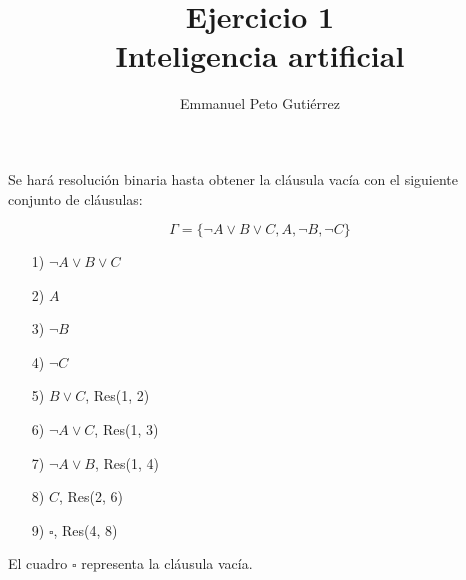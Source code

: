 \documentclass{article}
\title{Ejercicio 1\\Inteligencia artificial}
\author{Emmanuel Peto Gutiérrez}
\begin{document}
\maketitle

Se hará resolución binaria hasta obtener la cláusula vacía con el siguiente conjunto de cláusulas:

\[\Gamma = \{\lnot A \lor B \lor C, A , \lnot B, \lnot C\}\]

\begin{itemize}
\item[1)] $\lnot A \lor B \lor C$
\item[2)] $A$
\item[3)] $\lnot B$
\item[4)] $\lnot C$
\item[5)] $B \lor C$, Res(1, 2)
\item[6)] $\lnot A \lor C$, Res(1, 3)
\item[7)] $\lnot A \lor B$, Res(1, 4)
\item[8)] $C$, Res(2, 6)
\item[9)] $\square$, Res(4, 8)
\end{itemize}

El cuadro $\square$ representa la cláusula vacía.
\end{document}
